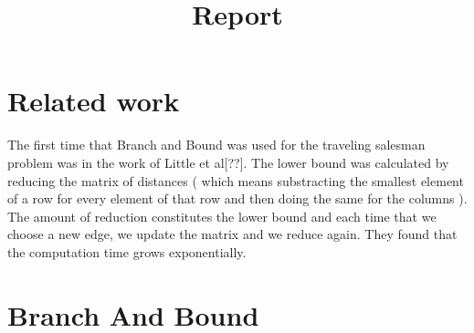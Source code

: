 \documentclass[12pt]{article}
\begin{document}
\title{Report}
\maketitle
\section{Related work}
The first time that Branch and Bound was used for the traveling salesman problem was in the work of Little et al[??]. The lower bound was calculated by reducing the matrix of distances ( which means substracting the smallest element of a row for every element of that row and then doing the same for the columns ). The amount of reduction constitutes the lower bound and each time that we choose a new edge, we update the matrix and we reduce again. They found that the computation time grows exponentially.
\section{Branch And Bound}
\end{document}
